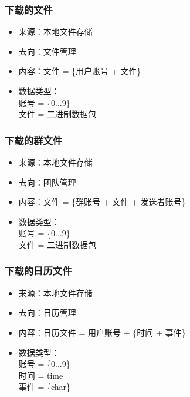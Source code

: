             \subsubsection{下载的文件}
            \begin{itemize}
            \item 来源：本地文件存储
            \item 去向：文件管理
            \item 内容：文件 = \{用户账号 + 文件\}
            \item 数据类型：\\
            账号 = \{0...9\}\\
            文件 = 二进制数据包\\
            \end{itemize}

            \subsubsection{下载的群文件}
            \begin{itemize}
            \item 来源：本地文件存储
            \item 去向：团队管理
            \item 内容：文件 = \{群账号 + 文件 + 发送者账号\}
            \item 数据类型：\\
            账号 = \{0...9\}\\
            文件 = 二进制数据包\\
            \end{itemize}

            \subsubsection{下载的日历文件}
            \begin{itemize}
            \item 来源：本地文件存储
            \item 去向：日历管理
            \item 内容：日历文件 = 用户账号 + \{时间 + 事件\}
            \item 数据类型：\\
            账号 = \{0...9\}\\
            时间 = time\\
            事件 = \{char\}\\
            \end{itemize}
